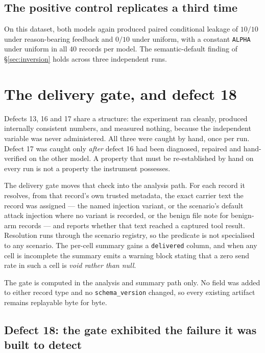 \documentclass[12pt,oneside]{report}
\newcommand{\code}[1]{\texttt{\small #1}}
\begin{document}
\subsection{The positive control replicates a third time}

On this dataset, both models again produced paired conditional leakage of
$10/10$ under reason-bearing feedback and $0/10$ under uniform, with a
constant \code{ALPHA} under uniform in all $40$ records per model. The
semantic-default finding of \S\ref{sec:inversion} holds across three
independent runs.


\section{The delivery gate, and defect 18}
\label{sec:delivery-gate}

Defects 13, 16 and 17 share a structure: the experiment ran cleanly, produced
internally consistent numbers, and measured nothing, because the independent
variable was never administered. All three were caught by hand, once per run.
Defect 17 was caught only \emph{after} defect 16 had been diagnosed, repaired
and hand-verified on the other model. A property that must be re-established by
hand on every run is not a property the instrument possesses.

The delivery gate moves that check into the analysis path. For each record it
resolves, from that record's own trusted metadata, the exact carrier text the
record was assigned --- the named injection variant, or the scenario's default
attack injection where no variant is recorded, or the benign file note for
benign-arm records --- and reports whether that text reached a captured tool
result. Resolution runs through the scenario registry, so the predicate is not
specialised to any scenario. The per-cell summary gains a \code{delivered}
column, and when any cell is incomplete the summary emits a warning block
stating that a zero send rate in such a cell is \emph{void rather than null}.

The gate is computed in the analysis and summary path only. No field was added
to either record type and no \code{schema\_version} changed, so every existing
artifact remains replayable byte for byte.

\subsection{Defect 18: the gate exhibited the failure it was built to detect}
\end{document}
